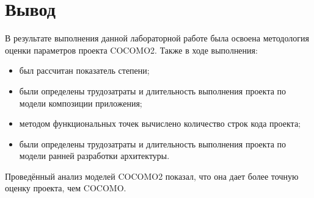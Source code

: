 \section{Вывод}

В результате выполнения данной лабораторной работе была освоена методология оценки параметров проекта COCOMO2. Также в ходе выполнения:

\begin{itemize}
    \item был рассчитан показатель степени;
    \item были определены трудозатраты и длительность выполнения проекта по модели композиции приложения;
    \item методом функциональных точек вычислено количество строк кода проекта;
    \item были определены трудозатраты и длительность выполнения проекта по модели ранней разработки архитектуры.
\end{itemize}

Проведённый анализ моделей COCOMO2 показал, что она дает более точную оценку проекта, чем COCOMO.
